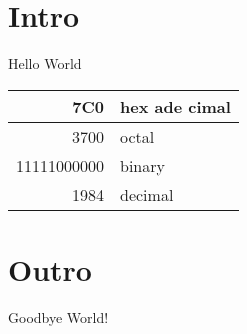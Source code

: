 \documentclass{article}
\begin{document}
\section{Intro}
Hello World

\renewcommand{\arraystretch}{1.5}

\begin{tabular}{|r|p{1cm}|}
  7C0 & hex ade cimal \\
  \hline
  3700 & octal \\ \cline{2-2}
  11111000000 & binary \\
  \hline \hline
  1984 & decimal \\
  \hline
\end{tabular}

\section{Outro}
Goodbye World!
\end{document}
